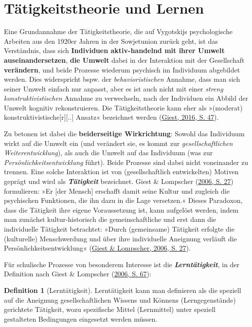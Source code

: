 \documentclass[
]{scrbook}
\theoremstyle{definition}
\newtheorem{definition}{Definition}[chapter]
\theoremstyle{definition}
\theoremstyle{definition}
\theoremstyle{definition}
\theoremstyle{remark}
\begin{document}
\hypertarget{taetigkeitstheorie-und-lernen}{%
\section{Tätigkeitstheorie und Lernen}\label{taetigkeitstheorie-und-lernen}}

Eine Grundannahme der Tätigkeitstheorie, die auf Vygotskijs psychologische Arbeiten aus den 1920er Jahren in der Sowjetunion zurück geht, ist das Verständnis, dass sich \textbf{Individuen aktiv-handelnd mit ihrer Umwelt auseinandersetzen}, \textbf{die Umwelt} dabei in der Interaktion mit der Gesellschaft \textbf{verändern}, und beide Prozesse wiederum psychisch im Individuum abgebildet werden. Dies widerspricht bspw. der \emph{behavioristischen} Annahme, dass man sich seiner Umwelt einfach nur anpasst, aber es ist auch nicht mit einer \emph{streng konstruktivistischen} Annahme zu verwechseln, nach der Individuen ein Abbild der Umwelt kognitiv rekonstruieren. Die Tätigkeitstheorie kann eher als »(moderat) konstruktivistische{[}r{]}{[}..{]} Ansatz« bezeichnet werden (\protect\hyperlink{ref-Giest2016a}{Giest, 2016, S. 47}).

Zu betonen ist dabei die \textbf{beiderseitige Wirkrichtung}: Sowohl das Individuum wirkt auf die Umwelt ein (und verändert sie, es kommt zur \emph{gesellschaftlichen Weiterentwicklung}), als auch die Umwelt auf das Individuum (was zur \emph{Persönlichkeitsentwicklung} führt). Beide Prozesse sind dabei nicht voneinander zu trennen. Eine solche Interaktion ist von (gesellschaftlich entwickelten) Motiven geprägt und wird als \textbf{\emph{Tätigkeit}} bezeichnet. Giest \& Lompscher (\protect\hyperlink{ref-Giest2006}{2006, S. 27}) formulieren: »Er {[}der Mensch{]} erschafft damit seine Kultur und zugleich die psychischen Funktionen, die ihn dazu in die Lage versetzen.« Dieses Paradoxon, dass die Tätigkeit ihre eigene Voraussetzung ist, kann aufgelöst werden, indem man zunächst kultur-historisch die gemeinschaftliche und erst dann die individuelle Tätigkeit betrachtet: »Durch (gemeinsame) Tätigkeit erfolgte die (kulturelle) Menschwerdung und über ihre individuelle Aneignung verläuft die Persönlichkeitsentwicklung« (\protect\hyperlink{ref-Giest2006}{Giest \& Lompscher, 2006, S. 27}).

Für schulische Prozesse von besonderem Interesse ist die \textbf{\emph{Lerntätigkeit}}, in der Definition nach Giest \& Lompscher (\protect\hyperlink{ref-Giest2006}{2006, S. 67}):

\begin{definition}[Lerntätigkeit]
\protect\hypertarget{def:Lerntaetigkeit}{}\label{def:Lerntaetigkeit}Lerntätigkeit kann man definieren als die speziell auf die Aneignung gesellschaftlichen Wissens und Könnens (Lerngegenstände) gerichtete Tätigkeit, wozu spezifische Mittel (Lernmittel) unter speziell gestalteten Bedingungen eingesetzt werden müssen.
\end{definition}
\end{document}

